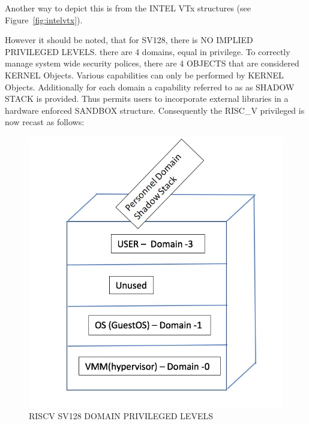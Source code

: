 \documentclass{article}
\begin{document}
Another way to depict this is  from the INTEL  VTx structures (see Figure~\ref{fig:intelvtx}).

However it should be noted,  that for SV128,  there is NO IMPLIED PRIVILEGED  LEVELS. there are 4 domains, equal in privilege.  To correctly manage system wide security polices,  there are 4 OBJECTS that are considered KERNEL  Objects.  Various capabilities can only  be performed by KERNEL Objects. Additionally for each domain a capability referred to as as SHADOW STACK is provided.  Thus permits users to incorporate external libraries in a hardware enforced SANDBOX  structure.  Consequently the RISC\_V privileged is now recast as follows:

\begin{figure}[h]
\begin{center}
\includegraphics[scale = .4]
{figures/domain_levels_software.jpg}  
\caption{RISC\-V SV128 DOMAIN PRIVILEGED LEVELS}
\end{center}
\end{figure}
\end{document}
